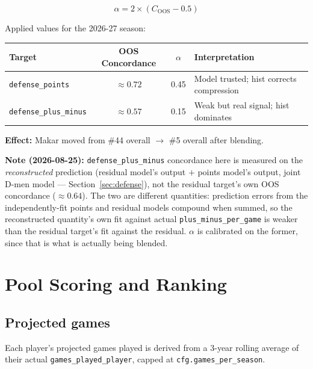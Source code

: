 \documentclass[11pt, a4paper]{article}
\begin{document}
\begin{equation}
  \alpha = 2 \times (C_{\text{OOS}} - 0.5)
  \label{eq:alpha}
\end{equation}

Applied values for the 2026-27 season:

\begin{center}
\begin{tabular}{lccl}
\toprule
Target & OOS Concordance & $\alpha$ & Interpretation \\
\midrule
\texttt{defense\_points}      & $\approx 0.72$ & 0.45 & Model trusted; hist corrects compression \\
\texttt{defense\_plus\_minus} & $\approx 0.57$ & 0.15 & Weak but real signal; hist dominates \\
\bottomrule
\end{tabular}
\end{center}

\textbf{Effect:} Makar moved from \#44 overall $\to$ \#5 overall after blending.

\textbf{Note (2026-08-25):} \texttt{defense\_plus\_minus} concordance here is measured on the
\emph{reconstructed} prediction (residual model's output $+$ points model's output, joint D-men
model — Section~\ref{sec:defense}), not the residual target's own OOS concordance ($\approx
0.64$). The two are different quantities: prediction errors from the independently-fit points
and residual models compound when summed, so the reconstructed quantity's own fit against actual
\texttt{plus\_minus\_per\_game} is weaker than the residual target's fit against the residual.
$\alpha$ is calibrated on the former, since that is what is actually being blended.


\section{Pool Scoring and Ranking}
\label{sec:scoring}

\subsection{Projected games}

Each player's projected games played is derived from a 3-year rolling average of their actual
\texttt{games\_played\_player}, capped at \texttt{cfg.games\_per\_season}.
\end{document}
